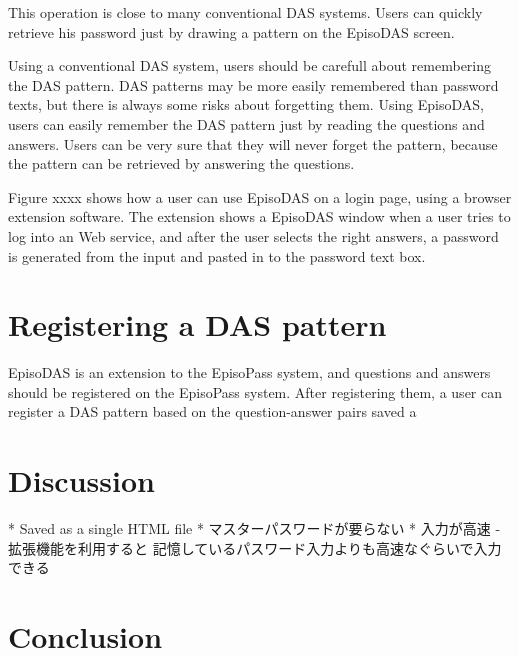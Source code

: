 \documentclass[sigconf]{acmart}
\begin{document}
This operation is close to many conventional DAS systems.
Users can quickly retrieve his password just by
drawing a pattern on the EpisoDAS screen.

Using a conventional DAS system, users should be carefull about
remembering the DAS pattern.
DAS patterns may be more easily remembered than password texts,
but there is always some risks about forgetting them.
Using EpisoDAS, users can easily remember the DAS pattern
just by reading the questions and answers.
Users can be very sure that they will never forget the pattern,
because the pattern can be retrieved by answering the questions.

Figure xxxx shows how a user can use EpisoDAS on a login page,
using a browser extension software.
The extension shows a EpisoDAS window when a user tries to log into
an Web service, and after the user selects the right answers,
a password is generated from the input and pasted in to the
password text box.

\section{Registering a DAS pattern}

EpisoDAS is an extension to the EpisoPass system, and questions and
answers should be registered on the EpisoPass system.
After registering them, a user can register a DAS pattern
based on the question-answer pairs saved a

\section{Discussion}

* Saved as a single HTML file
* マスターパスワードが要らない
* 入力が高速 -
拡張機能を利用すると
記憶しているパスワード入力よりも高速なぐらいで入力できる

\section{Conclusion}


% 

\end{document}
